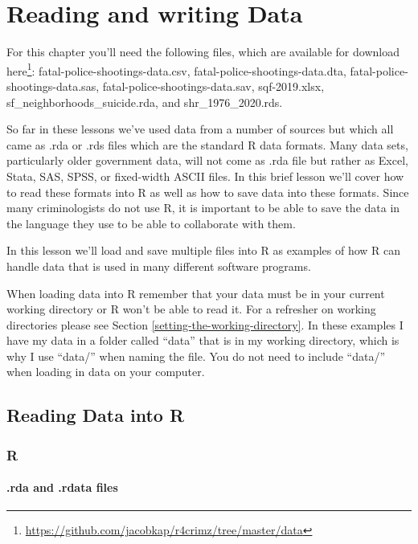 \documentclass[
]{krantz}
\renewcommand{\href}[2]{#2\footnote{\url{#1}}}
\begin{document}
\hypertarget{reading-and-writing-data}{%
\chapter{Reading and writing Data}\label{reading-and-writing-data}}

For this chapter you'll need the following files, which are available for download \href{https://github.com/jacobkap/r4crimz/tree/master/data}{here}: fatal-police-shootings-data.csv, fatal-police-shootings-data.dta, fatal-police-shootings-data.sas, fatal-police-shootings-data.sav, sqf-2019.xlsx, sf\_neighborhoods\_suicide.rda, and shr\_1976\_2020.rds.

So far in these lessons we've used data from a number of sources but which all came as .rda or .rds files which are the standard R data formats. Many data sets, particularly older government data, will not come as .rda file but rather as Excel, Stata, SAS, SPSS, or fixed-width ASCII files. In this brief lesson we'll cover how to read these formats into R as well as how to save data into these formats. Since many criminologists do not use R, it is important to be able to save the data in the language they use to be able to collaborate with them.

In this lesson we'll load and save multiple files into R as examples of how R can handle data that is used in many different software programs.

When loading data into R remember that your data must be in your current working directory or R won't be able to read it. For a refresher on working directories please see Section \ref{setting-the-working-directory}. In these examples I have my data in a folder called ``data'' that is in my working directory, which is why I use ``data/'' when naming the file. You do not need to include ``data/'' when loading in data on your computer.

\hypertarget{reading-data-into-r-1}{%
\section{Reading Data into R}\label{reading-data-into-r-1}}

\hypertarget{r}{%
\subsection{R}\label{r}}

\hypertarget{rda-and-.rdata-files}{%
\subsubsection{.rda and .rdata files}\label{rda-and-.rdata-files}}
\end{document}
